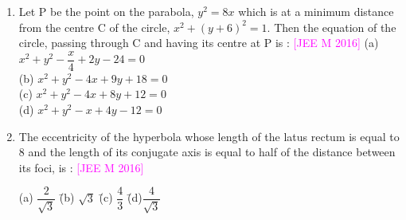 \documentclass[journal,12pt,twocolumn]{IEEEtran}
\theoremstyle{remark}
\begin{document}
\begin{enumerate}[label=\textcolor{magenta}{\arabic*.}]
    \hfill{\textcolor{magenta}{[JEE M 2015]}}
    \begin{tabbing}
        (a) $\dfrac{27}{2}$ \hspace{2em} \= (b) $27$ \hspace{2em} \= (c) $\dfrac{27}{4}$ \hspace{2em} \= (d) 18 \\
    \end{tabbing}
    \item Let P be the point on the parabola, $y^2=8x$ which is at a minimum distance from the centre C of the circle, $x^2+(y+6)^2=1$. Then the equation of the circle, passing through C and having its centre at P is :
    \hfill{\textcolor{magenta}{[JEE M 2016]}}
    (a) $x^2+y^2-\dfrac{x}{4}+2y-24=0$\\
    (b) $x^2+y^2-4x+9y+18=0$\\
    (c) $x^2+y^2-4x+8y+12=0$\\
    (d) $x^2+y^2-x+4y-12=0$\\
    \item The eccentricity of the hyperbola whose length of the latus rectum is equal to 8 and the length of its conjugate axis is equal to half of the distance between its foci, is :
    \hfill{\textcolor{magenta}{[JEE M 2016]}}
    \begin{tabbing}
        (a) $\dfrac{2}{\sqrt{3}}$ \hspace{2em} \= (b) $\sqrt{3}$ \hspace{2em} \= (c) $\dfrac{4}{3}$ \hspace{2em} \= (d)$\dfrac{4}{\sqrt{3}}$\\
    \end{tabbing}
    
\end{enumerate}
\end{document}
